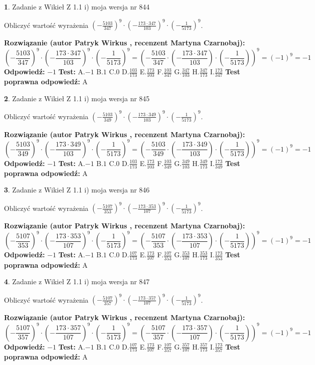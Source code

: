 \documentclass[12pt, a4paper]{article}
\theoremstyle{definition} %
\newtheorem{zad}{}
\newcommand{\zadStart}[1]{\begin{zad}#1\newline}
\newcommand{\zadStop}{\end{zad}}
\newcommand{\rozwStart}[2]{\noindent \textbf{Rozwiązanie (autor #1 , recenzent #2): }\newline}
\newcommand{\rozwStop}{\newline}
\newcommand{\odpStart}{\noindent \textbf{Odpowiedź:}\newline}
\newcommand{\odpStop}{\newline}
\newcommand{\testStart}{\noindent \textbf{Test:}\newline}
\newcommand{\testStop}{\newline}
\newcommand{\kluczStart}{\noindent \textbf{Test poprawna odpowiedź:}\newline}
\newcommand{\kluczStop}{\newline}
\begin{document}
\zadStart{Zadanie z Wikieł Z 1.1 i) moja wersja nr 844}

Obliczyć wartość wyrażenia $(-\frac{5103}{347})^{9} \cdot (-\frac{173 \cdot 347}{103})^{9} \cdot (-\frac{1}{5173})^{9}$.
\zadStop
\rozwStart{Patryk Wirkus}{Martyna Czarnobaj}
$$(-\frac{5103}{347})^{9} \cdot (-\frac{173 \cdot 347}{103})^{9} \cdot (-\frac{1}{5173})^{9} = (-\frac{5103}{347} \cdot (-\frac{173 \cdot 347}{103}) \cdot (-\frac{1}{5173}))^{9} = (-1)^{9} = -1$$
\rozwStop
\odpStart
$-1$
\odpStop
\testStart
A.$-1$ B.$1$ C.$0$ D.$\frac{103}{173}$ E.$\frac{173}{103}$
F.$\frac{103}{347}$ G.$\frac{347}{103}$
H.$\frac{347}{173}$
I.$\frac{173}{347}$
\testStop
\kluczStart
A
\kluczStop



\zadStart{Zadanie z Wikieł Z 1.1 i) moja wersja nr 845}

Obliczyć wartość wyrażenia $(-\frac{5103}{349})^{9} \cdot (-\frac{173 \cdot 349}{103})^{9} \cdot (-\frac{1}{5173})^{9}$.
\zadStop
\rozwStart{Patryk Wirkus}{Martyna Czarnobaj}
$$(-\frac{5103}{349})^{9} \cdot (-\frac{173 \cdot 349}{103})^{9} \cdot (-\frac{1}{5173})^{9} = (-\frac{5103}{349} \cdot (-\frac{173 \cdot 349}{103}) \cdot (-\frac{1}{5173}))^{9} = (-1)^{9} = -1$$
\rozwStop
\odpStart
$-1$
\odpStop
\testStart
A.$-1$ B.$1$ C.$0$ D.$\frac{103}{173}$ E.$\frac{173}{103}$
F.$\frac{103}{349}$ G.$\frac{349}{103}$
H.$\frac{349}{173}$
I.$\frac{173}{349}$
\testStop
\kluczStart
A
\kluczStop



\zadStart{Zadanie z Wikieł Z 1.1 i) moja wersja nr 846}

Obliczyć wartość wyrażenia $(-\frac{5107}{353})^{9} \cdot (-\frac{173 \cdot 353}{107})^{9} \cdot (-\frac{1}{5173})^{9}$.
\zadStop
\rozwStart{Patryk Wirkus}{Martyna Czarnobaj}
$$(-\frac{5107}{353})^{9} \cdot (-\frac{173 \cdot 353}{107})^{9} \cdot (-\frac{1}{5173})^{9} = (-\frac{5107}{353} \cdot (-\frac{173 \cdot 353}{107}) \cdot (-\frac{1}{5173}))^{9} = (-1)^{9} = -1$$
\rozwStop
\odpStart
$-1$
\odpStop
\testStart
A.$-1$ B.$1$ C.$0$ D.$\frac{107}{173}$ E.$\frac{173}{107}$
F.$\frac{107}{353}$ G.$\frac{353}{107}$
H.$\frac{353}{173}$
I.$\frac{173}{353}$
\testStop
\kluczStart
A
\kluczStop



\zadStart{Zadanie z Wikieł Z 1.1 i) moja wersja nr 847}

Obliczyć wartość wyrażenia $(-\frac{5107}{357})^{9} \cdot (-\frac{173 \cdot 357}{107})^{9} \cdot (-\frac{1}{5173})^{9}$.
\zadStop
\rozwStart{Patryk Wirkus}{Martyna Czarnobaj}
$$(-\frac{5107}{357})^{9} \cdot (-\frac{173 \cdot 357}{107})^{9} \cdot (-\frac{1}{5173})^{9} = (-\frac{5107}{357} \cdot (-\frac{173 \cdot 357}{107}) \cdot (-\frac{1}{5173}))^{9} = (-1)^{9} = -1$$
\rozwStop
\odpStart
$-1$
\odpStop
\testStart
A.$-1$ B.$1$ C.$0$ D.$\frac{107}{173}$ E.$\frac{173}{107}$
F.$\frac{107}{357}$ G.$\frac{357}{107}$
H.$\frac{357}{173}$
I.$\frac{173}{357}$
\testStop
\kluczStart
A
\kluczStop
\end{document}
